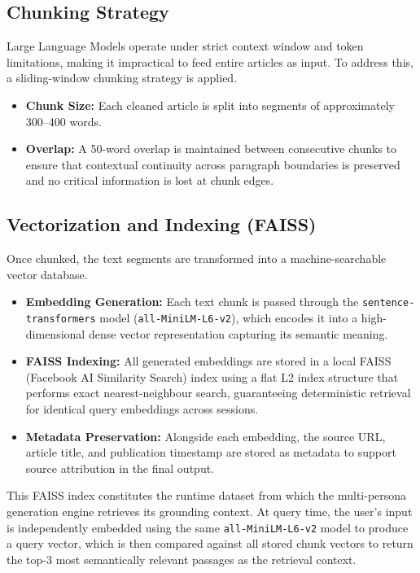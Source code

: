 \subsection{Chunking Strategy}

Large Language Models operate under strict context window and token limitations, making it impractical to feed entire articles as input. To address this, a sliding-window chunking strategy is applied.

\begin{itemize}
    \item \textbf{Chunk Size:} Each cleaned article is split into segments of approximately 300--400 words.
    \item \textbf{Overlap:} A 50-word overlap is maintained between consecutive chunks to ensure that contextual continuity across paragraph boundaries is preserved and no critical information is lost at chunk edges.
\end{itemize}

\subsection{Vectorization and Indexing (FAISS)}

Once chunked, the text segments are transformed into a machine-searchable vector database.

\begin{itemize}
    \item \textbf{Embedding Generation:} Each text chunk is passed through the \texttt{sentence-transformers} model (\texttt{all-MiniLM-L6-v2}), which encodes it into a high-dimensional dense vector representation capturing its semantic meaning.
    \item \textbf{FAISS Indexing:} All generated embeddings are stored in a local FAISS (Facebook AI Similarity Search) index using a flat L2 index structure that performs exact nearest-neighbour search, guaranteeing deterministic retrieval for identical query embeddings across sessions.
    \item \textbf{Metadata Preservation:} Alongside each embedding, the source URL, article title, and publication timestamp are stored as metadata to support source attribution in the final output.
\end{itemize}

This FAISS index constitutes the runtime dataset from which the multi-persona generation engine retrieves its grounding context.
At query time, the user's input is independently embedded using the same \texttt{all-MiniLM-L6-v2} model to produce a query vector, which is then compared against all stored chunk vectors to return the top-3 most semantically relevant passages as the retrieval context.
